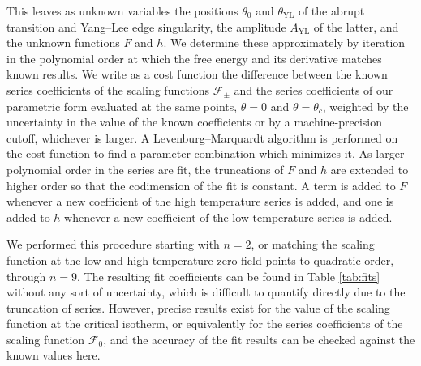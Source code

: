 \documentclass[
  aps,
  pre,
  preprint,
  longbibliography,
  floatfix
]{revtex4-2}
\begin{document}
This leaves as unknown variables the positions $\theta_0$ and
$\theta_{\mathrm{YL}}$ of the abrupt transition and Yang--Lee edge singularity,
the amplitude $A_\mathrm{YL}$ of the latter, and the unknown functions $F$ and
$h$. We determine these approximately by iteration in the polynomial order at
which the free energy and its derivative matches known results. We write as a
cost function the difference between the known series coefficients of the
scaling functions $\mathcal F_\pm$ and the series coefficients of our
parametric form evaluated at the same points, $\theta=0$ and $\theta=\theta_c$,
weighted by the uncertainty in the value of the known coefficients or by a
machine-precision cutoff, whichever is larger. A Levenburg--Marquardt algorithm
is performed on the cost function to find a parameter combination which
minimizes it. As larger polynomial order in the series are fit, the truncations
of $F$ and $h$ are extended to higher order so that the codimension of the fit
is constant. A term is added to $F$ whenever a new coefficient of the high
temperature series is added, and one is added to $h$ whenever a new coefficient
of the low temperature series is added.

We performed this procedure starting with $n=2$, or matching the scaling
function at the low and high temperature zero field points to quadratic order,
through $n=9$. The resulting fit coefficients can be found in Table
\ref{tab:fits} without any sort of uncertainty, which is difficult to quantify
directly due to the truncation of series. However, precise results exist for
the value of the scaling function at the critical isotherm, or equivalently for
the series coefficients of the scaling function $\mathcal F_0$, and the
accuracy of the fit results can be checked against the known values here.
\end{document}
